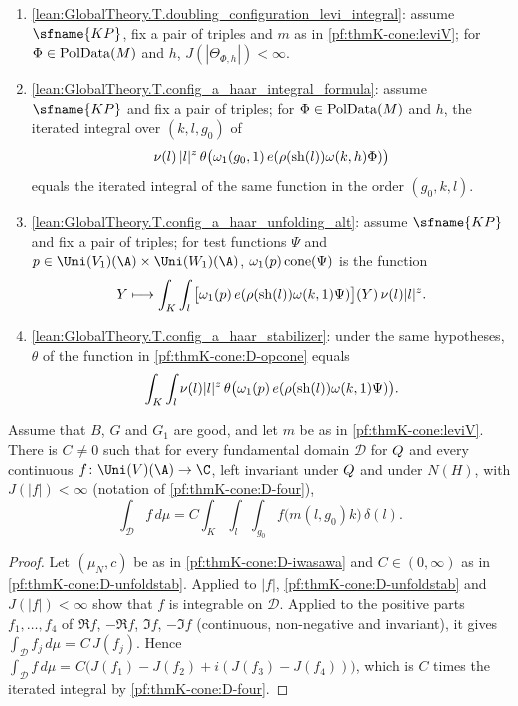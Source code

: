 \begin{enumerate}[resume*=thmKconeD]
\item\label{pf:thmK-cone:D-conv} \cref{lean:GlobalTheory.T.doubling_configuration_levi_integral}: assume $\sfname{KP}$,
  fix a pair of triples and $m$ as in \cref{pf:thmK-cone:leviV}; for $\Phi\in\operatorname{PolData}(M)$ and $h$,
  $J(|\Theta_{\Phi,h}|)<\infty$.
\item\label{pf:thmK-cone:D-fub} \cref{lean:GlobalTheory.T.config_a_haar_integral_formula}: assume $\sfname{KP}$ and fix
  a pair of triples; for $\Phi\in\operatorname{PolData}(M)$ and $h$, the iterated integral over $(k,l,g_0)$ of
  \[
    \nu(l)\,|l|^z\,\theta\bigl(\omega_1(g_0,1)\,e(\rho(\operatorname{sh}(l))\omega(k,h)\Phi)\bigr)
  \]
  equals the iterated integral of the same function in the order $(g_0,k,l)$.
\item\label{pf:thmK-cone:D-opcone} \cref{lean:GlobalTheory.T.config_a_haar_unfolding_alt}: assume $\sfname{KP}$ and fix
  a pair of triples; for test functions $\Psi$ and $p\in\Uni(V_1)(\A)\times\Uni(W_1)(\A)$, $\omega_1(p)\operatorname{cone}(\Psi)$
  is the function
  \[
    Y\longmapsto\int_K\int_l\,\bigl[\omega_1(p)\,e(\rho(\operatorname{sh}(l))\omega(k,1)\Psi)\bigr](Y)\,\nu(l)|l|^z .
  \]
\item\label{pf:thmK-cone:D-thcone} \cref{lean:GlobalTheory.T.config_a_haar_stabilizer}: under the same hypotheses,
  $\theta$ of the function in \ref{pf:thmK-cone:D-opcone} equals
  \[
    \int_K\int_l\nu(l)|l|^z\,\theta\bigl(\omega_1(p)\,e(\rho(\operatorname{sh}(l))\omega(k,1)\Psi)\bigr).
  \]
\end{enumerate}

\begin{lemma}\label{pf:thmK-cone:iwunfold}
Assume that $B$, $G$ and $G_1$ are good, and let $m$ be as in \cref{pf:thmK-cone:leviV}.  There is $C\neq0$ such
that for every fundamental domain $\mathcal D$ for $Q$ and every continuous $f\colon\Uni(V)(\A)\to\C$, left
invariant under $Q$ and under $N(H)$, with $J(|f|)<\infty$ (notation of \ref{pf:thmK-cone:D-four}),
\[
  \int_{\mathcal D}f\,d\mu=C\int_K\int_l\int_{g_0}f\bigl(m(l,g_0)k\bigr)\,\delta(l).
\]
\end{lemma}

\begin{proof}
Let $(\mu_N,c)$ be as in \ref{pf:thmK-cone:D-iwasawa} and $C\in(0,\infty)$ as in \ref{pf:thmK-cone:D-unfoldstab}.  Applied
to $|f|$, \ref{pf:thmK-cone:D-unfoldstab} and $J(|f|)<\infty$ show that $f$ is integrable on $\mathcal D$.  Applied to the
positive parts $f_1,\dots,f_4$ of $\Re f$, $-\Re f$, $\Im f$, $-\Im f$ (continuous, non-negative and invariant), it gives
$\int_{\mathcal D}f_j\,d\mu=C\,J(f_j)$.  Hence
$\int_{\mathcal D}f\,d\mu=C\bigl(J(f_1)-J(f_2)+i(J(f_3)-J(f_4))\bigr)$, which is $C$ times the iterated integral by
\ref{pf:thmK-cone:D-four}.
\end{proof}

